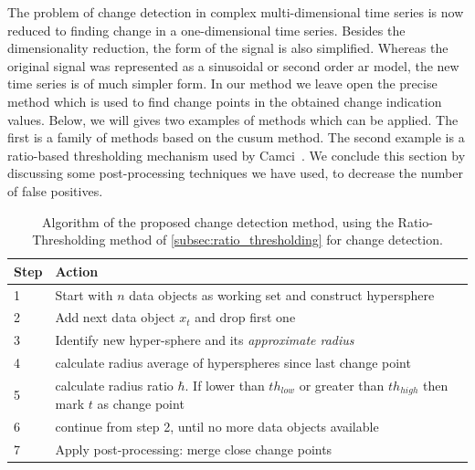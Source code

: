The problem of change detection in complex multi-dimensional time series is now reduced to finding change in a one-dimensional time series.
Besides the dimensionality reduction, the form of the signal is also simplified.
Whereas the original signal was represented as a sinusoidal or second order \gls{ar} model, the new time series is of much simpler form.
In our method we leave open the precise method which is used to find change points in the obtained change indication values.
Below, we will gives two examples of methods which can be applied.
The first is a family of methods based on the \gls{cusum} method.
The second example is a ratio-based thresholding mechanism used by Camci~\cite{camci2010change}.
We conclude this section by discussing some post-processing techniques we have used, to decrease the number of false positives.

\begin{center}\begin{table}
  \caption[Proposed algorithm]{Algorithm of the proposed change detection method, using the Ratio-Thresholding method of \ref{subsec:ratio_thresholding} for change detection.}
  \begin{tabular}{ l p{12cm} }
    \hline
    Step & Action \\
    \hline
    1 & Start with $n$ data objects as working set and construct hypersphere \\
    2 & Add next data object $x_t$ and drop first one \\
    3 & Identify new hyper-sphere and its \emph{approximate radius} \\
    4 & calculate radius average of hyperspheres since last change point \\
    5 & calculate radius ratio $\hbar$. If lower than ${th}_{low}$ or greater than ${th}_{high}$ then mark $t$ as change point \\
    6 & continue from step 2, until no more data objects available \\
    7 & Apply post-processing: merge close change points \\
    \hline
  \end{tabular}
  \label{tab:algorithm_proposed_method}
\end{table}\end{center}

